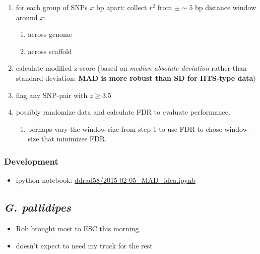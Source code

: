 \documentclass[letterpaper]{scrartcl}
\begin{document}
\begin{enumerate}
\def\labelenumi{\arabic{enumi}.}
\itemsep1pt\parskip0pt
\item
  for each group of SNPs \(x\) bp apart: collect \(r^2\) from
  \(\pm \sim5\) bp distance window around \(x\):

  \begin{enumerate}
  \def\labelenumii{\alph{enumii}.}
  \itemsep1pt\parskip0pt
  \item
    across genome
  \item
    across scaffold
  \end{enumerate}
\item
  calculate modified z-score (based on \emph{median absolute deviation}
  rather than standard deviation: \textbf{MAD is more robust than SD for
  HTS-type data})
\item
  flag any SNP-pair with \(z \geq 3.5\)
\item
  possibly randomize data and calculate FDR to evaluate performance.

  \begin{enumerate}
  \def\labelenumii{\alph{enumii}.}
  \itemsep1pt\parskip0pt
  \item
    perhaps vary the window-size from step 1 to use FDR to chose
    window-size that minimizes FDR.
  \end{enumerate}
\end{enumerate}

\subsubsection{Development}\label{development}

\begin{itemize}
\itemsep1pt\parskip0pt
\item
  ipython notebook:
  \href{file:///home/gus/Dropbox/common/ipy_notebooks/YALE/ddrad58/2015-02-05_MAD_idea.ipynb}{ddrad58/2015-02-05\_MAD\_idea.ipynb}
\end{itemize}

\subsection{\emph{G. pallidipes}}\label{g.-pallidipes}

\begin{itemize}
\itemsep1pt\parskip0pt
\item
  Rob brought most to ESC this morning
\item
  doesn't expect to need my truck for the rest
\end{itemize}
\end{document}
